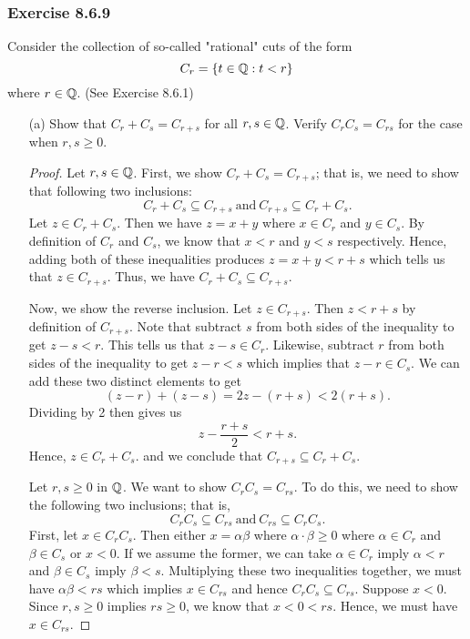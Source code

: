 \subsubsection{Exercise 8.6.9} Consider the collection of so-called "rational" cuts of the form 
\[  C_{r} = \{ t \in \mathbb{Q}  : t < r \}  \]
where \( r \in \mathbb{Q}  \). (See Exercise 8.6.1)
\begin{enumerate}
    \item[(a)] Show that \( C_{r} + C_{s} = C_{r+s} \) for all \( r,s \in \mathbb{Q}  \). Verify \( C_{r} C_{s} = C_{rs} \) for the case when \( r, s \geq 0  \).
        \begin{proof}
       Let \( r,s \in \mathbb{Q}  \). First, we show \( C_{r} + C_{s} = C_{r+s} \); that is, we need to show that following two inclusions:
       \[  C_{r } + C_{s} \subseteq C_{r+s} \ \text{and} \ C_{r+s} \subseteq C_{r} + C_{s}.   \]
    Let \( z \in C_{r} + C_{s} \). Then we have \( z = x + y   \) where \( x \in C_{r}  \) and \( y \in C_{s} \). By definition of \( C_{r} \) and \( C_{s } \), we know that \( x < r  \) and \( y < s  \) respectively. Hence, adding both of these inequalities produces \( z = x + y < r + s  \) which tells us that \( z \in C_{r+s} \). Thus, we have \( C_{r} + C_{s} \subseteq C_{r+s} \). 

    Now, we show the reverse inclusion. Let \( z \in C_{r+s} \). Then \( z < r + s  \) by definition of \( C_{r+s} \). Note that subtract \( s  \) from both sides of the inequality to get \( z - s < r  \). This tells us that \( z - s \in C_{r}  \). Likewise, subtract \( r  \) from both sides of the inequality to get \( z - r < s  \) which implies that \( z -r  \in C_{s} \). We can add these two distinct elements to get 
    \[ (z-r) + (z-s) = 2z - (r+s) < 2(r+s). \]
    Dividing by 2 then gives us 
    \[  z - \frac{ r+s }{ 2 }  < r + s. \]
    Hence, \( z \in C_{r} + C_{s}. \) and we conclude that \( C_{r+s} \subseteq C_{r} + C_{s} \).

    Let \( r, s \geq 0  \) in \( \mathbb{Q}  \). We want to show \( C_{r} C_{s} = C_{rs} \). To do this, we need to show the following two inclusions; that is, 
    \[  C_{r} C_{s} \subseteq C_{rs} \ \text{and} \ C_{rs} \subseteq C_{r} C_{s}. \]
    First, let \( x \in C_{r}  C_{s}   \). Then either \( x = \alpha  \beta  \) where \( \alpha \cdot \beta \geq   0  \) where \( \alpha \in C_{r} \) and \( \beta \in C_{s} \) or \( x < 0 \). If we assume the former, we can take \( \alpha \in C_{r}  \) imply \( \alpha < r  \) and \( \beta \in C_{s}  \) imply \( \beta < s  \). Multiplying these two inequalities together, we must have \( \alpha \beta < rs  \) which implies \( x  \in C_{rs}  \) and hence \( C_{r} C_{s} \subseteq C_{rs} \). Suppose \( x < 0  \). Since \( r, s \geq 0  \) implies \( rs \geq  0  \), we know that \( x < 0 < rs \). Hence, we must have \( x \in C_{rs} \). 


\end{proof}
\end{enumerate}
